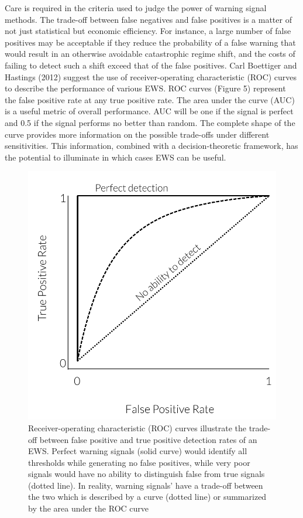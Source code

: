 \documentclass[author-year, review]{elsarticle} %
\makeatletter
\def\maxwidth{\ifdim\Gin@nat@width>\linewidth\linewidth
\else\Gin@nat@width\fi}
\let\Oldincludegraphics\includegraphics
\renewcommand{\includegraphics}[1]{\Oldincludegraphics[width=\maxwidth]{#1}}
\makeatother
\begin{document}
Care is required in the criteria used to judge the power of warning
signal methods. The trade-off between false negatives and false
positives is a matter of not just statistical but economic efficiency.
For instance, a large number of false positives may be acceptable if
they reduce the probability of a false warning that would result in an
otherwise avoidable catastrophic regime shift, and the costs of failing
to detect such a shift exceed that of the false positives. Carl
Boettiger and Hastings (2012) suggest the use of receiver-operating
characteristic (ROC) curves to describe the performance of various EWS.
ROC curves (Figure 5) represent the false positive rate at any true
positive rate. The area under the curve (AUC) is a useful metric of
overall performance. AUC will be one if the signal is perfect and 0.5 if
the signal performs no better than random. The complete shape of the
curve provides more information on the possible trade-offs under
different sensitivities. This information, combined with a
decision-theoretic framework, has the potential to illuminate in which
cases EWS can be useful.

\begin{figure}[htbp]
\centering
\includegraphics{ROC.pdf}
\caption{Receiver-operating characteristic (ROC) curves illustrate the
trade-off between false positive and true positive detection rates of an
EWS. Perfect warning signals (solid curve) would identify all thresholds
while generating no false positives, while very poor signals would have
no ability to distinguish false from true signals (dotted line). In
reality, warning signals' have a trade-off between the two which is
described by a curve (dotted line) or summarized by the area under the
ROC curve}
\end{figure}
\end{document}
